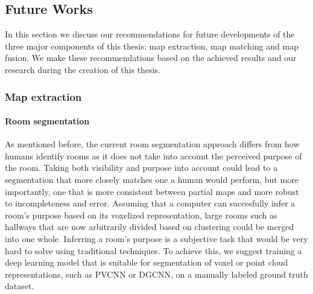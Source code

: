 \subsection{Future Works}
In this section we discuss our recommendations for future developments of the three major components of this thesis: map extraction, map matching and map fusion. We make these recommendations based on the achieved results and our research during the creation of this thesis. 

\subsubsection{Map extraction}

\paragraph{Room segmentation}
As mentioned before, the current room segmentation approach differs from how humans identify rooms as it does not take into account the perceived purpose of the room. Taking both visibility and purpose into account could lead to a segmentation that more closely matches one a human would perform, but more importantly, one that is more consistent between partial maps and more robust to incompleteness and error. Assuming that a computer can succesfully infer a room's purpose based on its voxelized representation, large rooms such as hallways that are now arbitrarily divided based on clustering could be merged into one whole. Inferring a room's purpose is a subjective task that would be very hard to solve using traditional techniques. To achieve this, we suggest training a deep learning model that is suitable for segmentation of voxel or point cloud representations, such as PVCNN or DGCNN, on a manually labeled ground truth dataset. 

